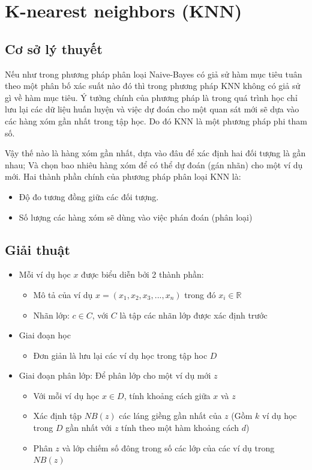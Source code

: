 \documentclass[a4paper,12pt]{report}
\begin{document}
\section{K-nearest neighbors (KNN)}
\subsection{Cơ sở lý thuyết}
Nếu như trong phương pháp phân loại Naive-Bayes có giả sử hàm mục tiêu tuân theo một phân bố xác suất nào đó thì trong phương pháp KNN không có giả sử gì về hàm mục tiêu. Ý tưởng chính của phương pháp là trong quá trình học chỉ lưu lại các dữ liệu huấn luyện và việc dự đoán cho một quan sát mới sẽ dựa vào các hàng xóm gần nhất trong tập học. Do đó KNN là một phương pháp phi tham số.
\par Vậy thế nào là hàng xóm gần nhất, dựa vào đâu để xác định hai đối tượng là gần nhau; Và chọn bao nhiêu hàng xóm để có thể dự đoán (gán nhãn) cho một ví dụ mới. Hai thành phần chính của phương pháp phân loại KNN là:
\begin{itemize}
\item Độ đo tương đồng giữa các đối tượng.
\item Số lượng các hàng xóm sẽ dùng vào việc phán đoán (phân loại)
\end{itemize} 

\subsection{Giải thuật}
\begin{itemize}
\item Mỗi ví dụ học $x$ được biểu diễn bởi 2 thành phần:
\begin{itemize}
\item Mô tả của ví dụ $x = (x_1, x_2, x_3, ..., x_n)$ trong đó $x_i \in \mathbb{R}$
\item Nhãn lớp: $c \in C$, với $C$ là tập các nhãn lớp được xác định trước
\end{itemize}
\item Giai đoạn học
\begin{itemize}
\item Đơn giản là lưu lại các ví dụ học trong tập hoc $D$
\end{itemize}
\item Giai đoạn phân lớp: Để phân lớp cho một ví dụ mới $z$
\begin{itemize}
\item Với mỗi ví dụ học $x \in D$, tính khoảng cách giữa $x$ và $z$
\item Xác định tập $NB(z)$ các láng giềng gần nhất của $z$ (Gồm $k$ ví dụ học trong $D$ gần nhất với $z$ tính theo một hàm khoảng cách $d$)
\item Phân $z$ và lớp chiếm số đông trong số các lớp của các ví dụ trong $NB(z)$
\end{itemize}
\end{itemize}
\end{document}

